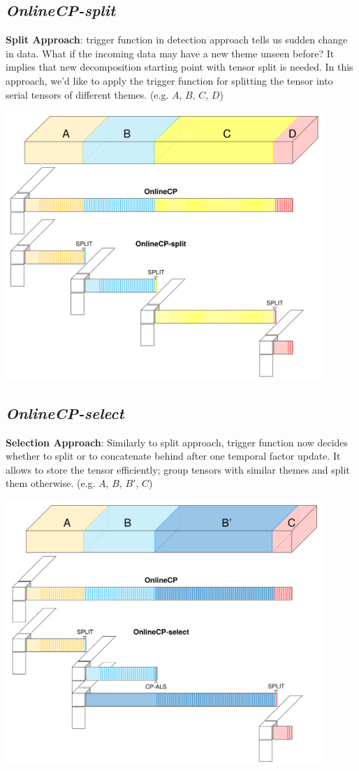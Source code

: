 \newpage
\subsection{\em OnlineCP-split}
\textbf{Split Approach}: trigger function in detection approach tells us sudden change in data. What if the incoming data may have a new theme unseen before? It implies that new decomposition starting point with tensor split is needed. In this approach, we'd like to apply the trigger function for splitting the tensor into serial tensors of different themes. (e.g. $A$, $B$, $C$, $D$)

\begin{center}
	\includegraphics[width=0.9\textwidth]{FIG/OnlineCP-split.png}
\end{center}

\newpage
\subsection{\em OnlineCP-select}
\textbf{Selection Approach}: Similarly to split approach, trigger function now decides whether to split or to concatenate behind after one temporal factor update. It allows to store the tensor efficiently; group tensors with similar themes and split them otherwise. (e.g. $A$, $B$, $B'$, $C$)

\begin{center}
	\includegraphics[width=0.9\textwidth]{FIG/OnlineCP-select.png}
\end{center}